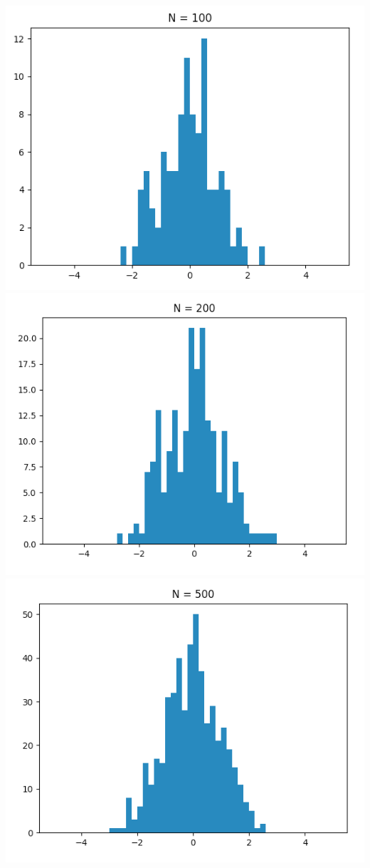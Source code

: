 \documentclass[a4paper]{article}
\begin{document}
\section{}
\includegraphics[scale=.4]{100.png}
\includegraphics[scale=.4]{200.png}
\includegraphics[scale=.4]{500.png}
\end{document}

